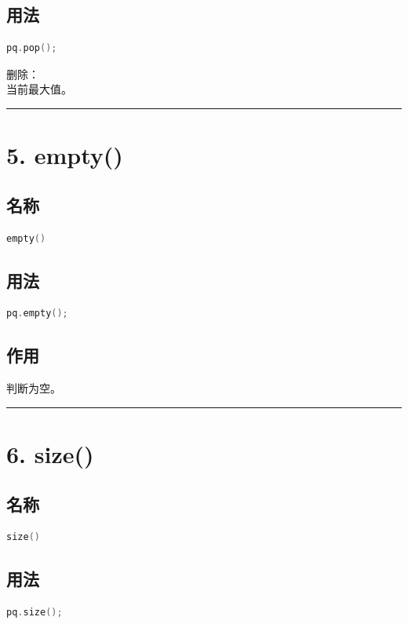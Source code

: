 \documentclass[9pt,twocolumn]{extarticle}
\begin{document}
\subsection{用法}
\begin{lstlisting}[language=C++]
pq.pop();
\end{lstlisting}
删除：\\
当前最大值。

\noindent\rule{\linewidth}{0.4pt}

\section{5. empty()}

\subsection{名称}
\begin{lstlisting}[language=C++]
empty()
\end{lstlisting}

\subsection{用法}
\begin{lstlisting}[language=C++]
pq.empty();
\end{lstlisting}

\subsection{作用}
判断为空。

\noindent\rule{\linewidth}{0.4pt}

\section{6. size()}

\subsection{名称}
\begin{lstlisting}[language=C++]
size()
\end{lstlisting}

\subsection{用法}
\begin{lstlisting}[language=C++]
pq.size();
\end{lstlisting}
\end{document}
